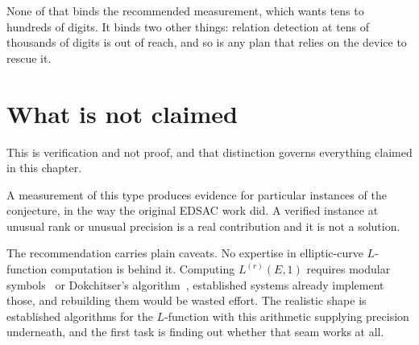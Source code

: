 None of that binds the recommended measurement, which wants tens to hundreds of digits. It binds two
other things: relation detection at tens of thousands of digits is out of reach, and so is any plan
that relies on the device to rescue it.

\section{What is not claimed}

This is verification and not proof, and that distinction governs everything claimed in this
chapter.

A measurement of this type produces evidence for particular instances of the conjecture, in the way
the original EDSAC work did. A verified instance at unusual rank or unusual precision is a real
contribution and it is not a solution.

The recommendation carries plain caveats. No expertise in elliptic-curve $L$-function computation
is behind it. Computing $L^{(r)}(E,1)$ requires modular symbols~\cite{src:Cremona-1997} or
Dokchitser's algorithm~\cite{src:Dokchitser-2004}, established systems already implement those, and
rebuilding them would be wasted effort. The realistic shape is established algorithms for the
$L$-function with this arithmetic supplying precision underneath, and the first task is finding out
whether that seam works at all.
